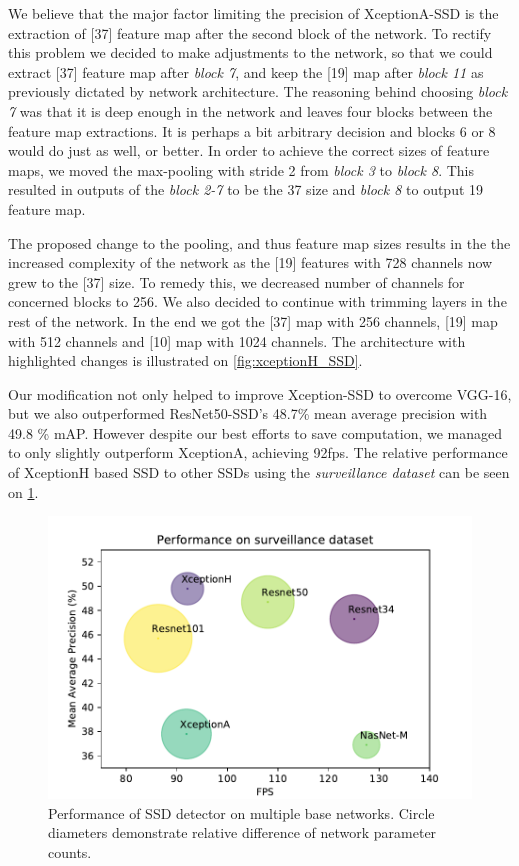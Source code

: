 We believe that the major factor limiting the precision of XceptionA-SSD is the extraction of [37] feature map after the second block of the network. To rectify this problem we decided to make adjustments to the network, so that we could extract [37] feature map after \textit{block 7}, and keep the [19] map after \textit{block 11} as previously dictated by network architecture. The reasoning behind choosing \textit{block 7} was that it is deep enough in the network and leaves four blocks between the feature map extractions. It is perhaps a bit arbitrary decision and blocks 6 or 8 would do just as well, or better.  In order to achieve the correct sizes of feature maps, we moved the max-pooling with stride 2 from \textit{block 3} to \textit{block 8}. This resulted in outputs of the \textit{block 2-7} to be the 37 size and \textit{block 8} to output 19 feature map. 

The proposed change to the pooling, and thus feature map sizes results in the the increased complexity of the network as the [19] features with 728 channels now grew to the [37] size. To remedy this, we decreased number of channels for concerned blocks to 256. We also decided to continue with trimming layers in the rest of the network. In the end we got the [37] map with 256 channels, [19] map with 512 channels and [10] map with 1024 channels. The architecture with highlighted changes is illustrated on \cref{fig:xceptionH_SSD}. 

Our modification not only helped to improve Xception-SSD to overcome VGG-16, but we also outperformed ResNet50-SSD's 48.7\% mean average precision with 49.8 \% mAP. However despite our best efforts to save computation, we managed to only slightly outperform XceptionA, achieving 92fps. The relative performance of XceptionH based SSD to other SSDs using the \textit{surveillance dataset} can be seen on \cref{fig:surv_perf}.

\begin{figure}
    \centering
    \includegraphics[width=\textwidth]{img/fps_map_s}
    \caption[Performance of SSD with multiple base networks on Surveillance dataset]{Performance of SSD detector on multiple base networks. Circle diameters demonstrate relative difference of network parameter counts.} 
    \label{fig:surv_perf}
\end{figure}

